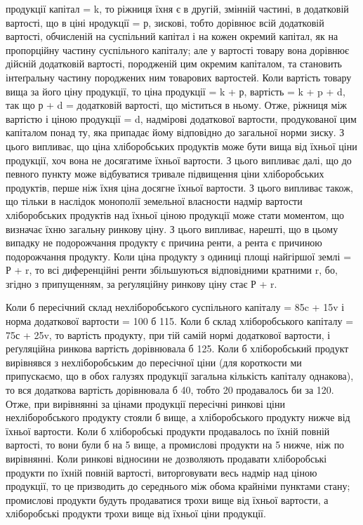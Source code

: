 продукції капітал = k, то ріжниця їхня є в другій, змінній частині, в додатковій
вартості, що в ціні нродукції = р, зискові, тобто дорівнює всій додатковій
вартості, обчисленій на суспільний капітал і на кожен окремий капітал, як на
пропорційну частину суспільного капіталу; але у вартості товару вона дорівнює
дійсній додатковій вартості, породженій цим окремим капіталом, та становить
інтеґральну частину породжених ним товарових вартостей. Коли вартість товару
вища за його ціну продукції, то ціна продукції = k + р, вартість = k + p + d,
так що р + d = додатковій вартості, що міститься в ньому. Отже, ріжниця між
вартістю і ціною продукції = d, надмірові додаткової вартости, продукованої цим
капіталом понад ту, яка припадає йому відповідно до загальної норми зиску.
З цього випливає, що ціна хліборобських продуктів може бути вища від їхньої
ціни продукції, хоч вона не досягатиме їхньої вартости. З цього випливає
далі, що до певного пункту може відбуватися тривале підвищення ціни
хліборобських продуктів, перше ніж їхня ціна досягне їхньої вартости. З цього
випливає також, що тільки в наслідок монополії земельної власности надмір
вартости хліборобських продуктів над їхньої ціною продукції може стати моментом,
що визначає їхню загальну ринкову ціну. З цього випливає, нарешті,
що в цьому випадку не подорожчання продукту є причина ренти, а рента
є причиною подорожчання продукту. Коли ціна продукту з одиниці площі найгіршої
землі = Р + r, то всі диференційні ренти збільшуються відповідними кратними
r, бо, згідно з припущенням, за реґуляційну ринкову ціну стає Р + r.

Коли б пересічний склад нехліборобського суспільного капіталу =
85c + 15v і норма додаткової вартости = 100%
б 115. Коли б склад хліборобського капіталу = 75с + 25v, то вартість
продукту, при тій самій нормі додаткової вартости, і реґуляційна ринкова
вартість дорівнювала б 125. Коли б хліборобський продукт вирівнявся з нехліборобським
до пересічної ціни (для короткости ми припускаємо, що в обох галузях
продукції загальна кількість капіталу однакова), то вся додаткова вартість
дорівнювала б 40, тобто 20%
продавалось би за 120. Отже, при вирівнянні за цінами продукції пересічні ринкові
ціни нехліборобського продукту стояли б вище, а хліборобського продукту
нижче від їхньої вартости. Коли б хліборобські продукти продавалось по їхній
повній вартості, то вони були б на 5 вище, а промислові продукти
на 5 нижче, ніж по вирівнянні. Коли ринкові відносини не дозволяють продавати
хліборобські продукти по їхній повній вартості, виторговувати весь надмір
над ціною продукції, то це призводить до середнього між обома крайніми
пунктами стану; промислові продукти будуть продаватися трохи вище від їхньої
вартости, а хліборобські продукти трохи вище від їхньої ціни продукції.

